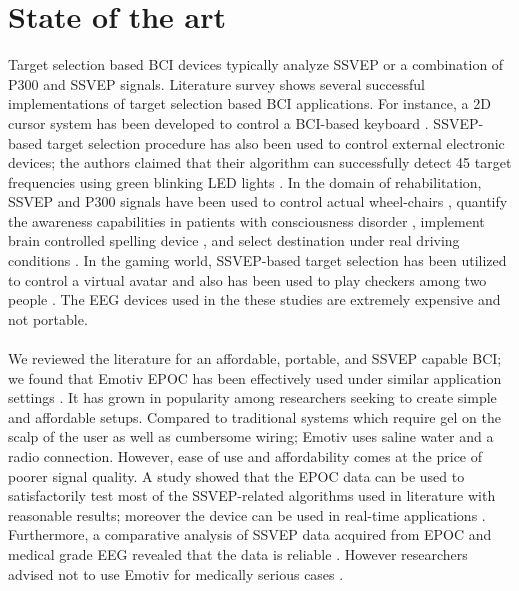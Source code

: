 \documentclass[smallextended]{svjour3}
\begin{document}
\section{State of the art}
\label{sec:soa}
Target selection based BCI devices typically analyze SSVEP or a combination of P300 and SSVEP signals. Literature survey shows several successful implementations of target selection based BCI applications. For instance, a 2D cursor system has been developed to control a BCI-based keyboard \cite{yin2015hybrid}. SSVEP-based target selection procedure has also been used to control external electronic devices; the authors claimed that their algorithm can successfully detect 45 target frequencies using green blinking LED lights \cite{SSVEPfiability}. In the domain of rehabilitation, SSVEP and P300 signals have been used to control actual wheel-chairs \cite{paper4}, quantify the awareness capabilities in patients with consciousness disorder \cite{paper8}, implement brain controlled spelling device \cite{paper2}, and select destination under real driving conditions \cite{car}. In the gaming world, SSVEP-based target selection has been utilized to control a virtual avatar \cite{paper_5} and also has been used to play checkers among two people \cite{paper6}. The EEG devices used in the these studies are extremely expensive and not portable.\\
\\
We reviewed the literature for an affordable, portable, and SSVEP capable BCI; we found that Emotiv EPOC has been effectively used under similar application settings \cite{jian2014improving,van2012designing}. It has grown in popularity among researchers seeking to create simple and affordable setups. Compared to traditional systems which require gel on the scalp of the user as well as cumbersome wiring; Emotiv uses saline water and a radio connection. However, ease of use and affordability comes at the price of poorer signal quality. A study showed that the EPOC data can be used to satisfactorily test most of the SSVEP-related algorithms used in literature with reasonable results; moreover the device can be used in real-time applications \cite{hvaring2014comparison}. Furthermore, a comparative analysis of SSVEP data acquired from EPOC and medical grade EEG revealed that the data is reliable \cite{liu2012implementation}. However researchers advised not to use Emotiv for medically serious cases \cite{duvinage2013performance}.\\
\\
\end{document}
